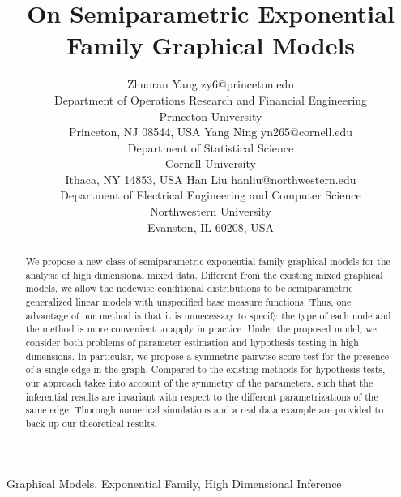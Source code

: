 \documentclass[twoside,11pt]{article}
\begin{document}
\title{On Semiparametric Exponential Family Graphical Models}

\author{\name Zhuoran Yang \email zy6@princeton.edu \\
       \addr Department of Operations Research and Financial Engineering\\
       Princeton University\\
       Princeton, NJ 08544, USA
       \AND
       \name Yang Ning \email yn265@cornell.edu \\
       \addr Department of Statistical Science\\
       Cornell University\\
       Ithaca,  NY 14853, USA
       \AND
       \name Han Liu \email hanliu@northwestern.edu\\
       \addr Department of Electrical Engineering and Computer Science\\
       Northwestern University\\
       Evanston, IL 60208, USA}


\maketitle

\begin{abstract}%
We propose a new class of semiparametric exponential family graphical models for the analysis of high dimensional mixed data. Different from the existing mixed graphical models, we allow the nodewise conditional distributions to be semiparametric generalized linear models with unspecified base measure functions. Thus, one advantage of our method is that it is unnecessary to specify the type of each node and the method is more convenient to apply in practice. Under the proposed model, we consider both problems of parameter estimation and hypothesis testing in high dimensions. In particular, we propose a symmetric pairwise score test for the presence of a single edge in the graph. Compared to the existing methods for hypothesis tests, our approach takes into account of the symmetry of the parameters, such that the inferential results are invariant with respect to the different parametrizations of the same edge. 
Thorough numerical simulations and a real data example are provided to back up our theoretical results. \end{abstract}

\begin{keywords}
  Graphical Models, Exponential Family, High Dimensional Inference
\end{keywords}
 
\end{document}
